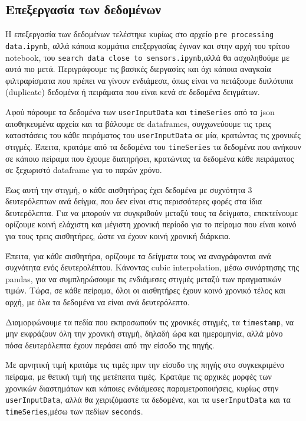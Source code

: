 \subsection{Επεξεργασία των δεδομένων}

Η επεξεργασία των δεδομένων τελέστηκε κυρίως στο αρχείο \texttt{pre processing data.ipynb},
αλλά κάποια κομμάτια επεξεργασίας έγιναν και στην αρχή του τρίτου notebook,
του \texttt{search data close to sensors.ipynb},αλλά θα ασχοληθούμε με αυτά πιο μετά.
Περιγράφουμε τις βασικές διεργασίες και όχι κάποια αναγκαία φιλτραρίσματα που πρέπει να γίνουν ενδιάμεσα,
όπως είναι να πετάξουμε διπλότυπα (duplicate) δεδομένα ή πειράματα που είναι κενά σε δεδομένα δειγμάτων.


Αφού πάρουμε τα δεδομένα των \texttt{userInputData} και \texttt{timeSeries} από τα json αποθηκευμένα αρχεία 
και τα βάλουμε σε dataframes, συγχωνεύουμε τις τρεις καταστάσεις του κάθε πειράματος του \texttt{userInputData} σε μία, κρατώντας τις χρονικές στιγμές.
Έπειτα, κρατάμε από τα δεδομένα του \texttt{timeSeries} τα δεδομένα που ανήκουν σε κάποιο πείραμα που έχουμε διατηρήσει,
κρατώντας τα δεδομένα κάθε πειράματος σε ξεχωριστό dataframe για το παρών χρόνο.

Έως αυτή την στιγμή, ο κάθε αισθητήρας έχει δεδομένα με συχνότητα 3 δευτερόλεπτων ανά δείγμα,
που δεν είναι στις περισσότερες φορές στα ίδια δευτερόλεπτα.
Για να μπορούν να συγκριθούν μεταξύ τους τα δείγματα, επεκτείνουμε ορίζουμε κοινή ελάχιστη και μέγιστη χρονική περίοδο 
για το πείραμα που είναι κοινό για τους τρεις αισθητήρες, ώστε να έχουν κοινή χρονική διάρκεια.

Έπειτα, για κάθε αισθητήρα, ορίζουμε τα δείγματα τους να αναγράφονται ανά συχνότητα ενός δευτερολέπτου.
Κάνοντας cubic interpolation, μέσω συνάρτησης της pandas, για να συμπληρώσουμε τις ενδιάμεσες στιγμές 
μεταξύ των πραγματικών τιμών.
Τώρα, σε κάθε πείραμα, όλοι οι αισθητήρες έχουν κοινό χρονικό τέλος και αρχή, με όλα τα δεδομένα να είναι ανά δευτερόλεπτο.

Διαμορφώνουμε τα πεδία που εκπροσωπούν τις χρονικές στιγμές, τα \texttt{\linebreak timestamp}, να μην εκφράζουν όλη την χρονική στιγμή,
δηλαδή ώρα και ημερομηνία, αλλά μόνο πόσα δευτερόλεπτα έχουν περάσει από την είσοδο της πηγής.

Με αρνητική τιμή κρατάμε τις τιμές πριν την είσοδο της πηγής στο συγκεκριμένο πείραμα, με θετική τιμή της μετέπειτα τιμές.
Κρατάμε τις αρχικές μορφές των χρονικών διαστημάτων και κάποιες ενδιάμεσες παραμετροποιήσεις, κυρίως στην \texttt{userInputData},
αλλά θα χειριζόμαστε τα δεδομένα, και τα \texttt{userInputData} και τα \texttt{timeSeries},μέσω των πεδίων \texttt{seconds}.

